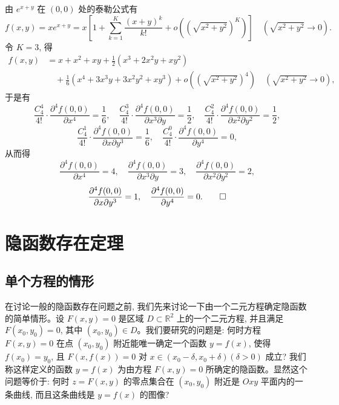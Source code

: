 \begin{solve}
由 $e^{x+y}$ 在 $(0,0)$ 处的泰勒公式有
\[
  f(x,y)=xe^{x+y}
  =x\left[1+\sum_{k=1}^K\frac{(x+y)^k}{k!}
  +o\left((\sqrt{x^2+y^2})^K\right)\right]
  \quad(\sqrt{x^2+y^2}\to0).
\]
令 $K=3$, 得
\[
\begin{aligned}
  f(x,y)
  &=x+x^2+xy+\frac12(x^3+2x^2y+xy^2)\\
  &\quad+\frac16(x^4+3x^3y+3x^2y^2+xy^3)
  +o\left((\sqrt{x^2+y^2})^4\right)
  \quad(\sqrt{x^2+y^2}\to0),
\end{aligned}
\]
于是有
\[
  \frac{C_4^4}{4!}\cdot\frac{\partial^4 f(0,0)}{\partial x^4}=\frac16,\quad
  \frac{C_4^3}{4!}\cdot\frac{\partial^4 f(0,0)}{\partial x^3\partial y}=\frac12,\quad
  \frac{C_4^2}{4!}\cdot\frac{\partial^4 f(0,0)}{\partial x^2\partial y^2}=\frac12,
\]
\[
  \frac{C_4^1}{4!}\cdot\frac{\partial^4 f(0,0)}{\partial x\partial y^3}=\frac16,\quad
  \frac{C_4^0}{4!}\cdot\frac{\partial^4 f(0,0)}{\partial y^4}=0,
\]
从而得
\[
  \frac{\partial^4 f(0,0)}{\partial x^4}=4,\quad
  \frac{\partial^4 f(0,0)}{\partial x^3\partial y}=3,\quad
  \frac{\partial^4 f(0,0)}{\partial x^2\partial y^2}=2,
\]
\[
  \frac{\partial^4 f(0,0)}{\partial x\partial y^3}=1,\quad
  \frac{\partial^4 f(0,0)}{\partial y^4}=0.
\qedhere
\]
\end{solve}


\section{隐函数存在定理}
\label{sec:ma-14-4}

\subsection{单个方程的情形}
\label{subsec:ma-14-4-1}

在讨论一般的隐函数存在问题之前, 我们先来讨论一下由一个二元方程确定隐函数的简单情形。设 $F(x,y)=0$ 是区域 $D\subset\mathbb R^2$ 上的一个二元方程, 并且满足 $F(x_0,y_0)=0$, 其中 $(x_0,y_0)\in D$。我们要研究的问题是: 何时方程 $F(x,y)=0$ 在点 $(x_0,y_0)$ 附近能唯一确定一个函数 $y=f(x)$, 使得 $f(x_0)=y_0$, 且 $F(x,f(x))=0$ 对 $x\in(x_0-\delta,x_0+\delta)(\delta>0)$ 成立? 我们称这样定义的函数 $y=f(x)$ 为由方程 $F(x,y)=0$ 所确定的隐函数。显然这个问题等价于: 何时 $z=F(x,y)$ 的零点集合在 $(x_0,y_0)$ 附近是 $Oxy$ 平面内的一条曲线, 而且这条曲线是 $y=f(x)$ 的图像?

